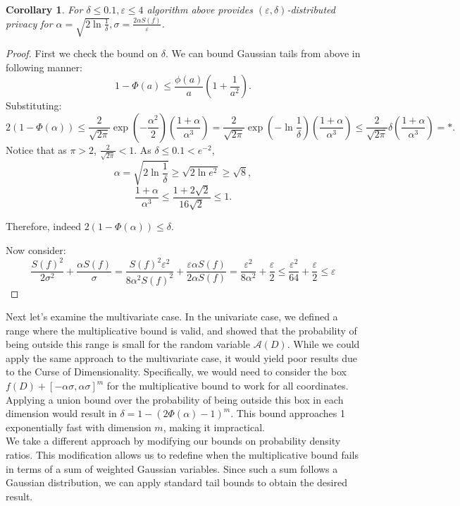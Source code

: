 \documentclass[12pt,letterpaper]{article}
\let\eps\varepsilon
\newtheorem{corollary}{Corollary}
\begin{document}
\begin{corollary}
  For $\delta \leq 0.1, \eps \leq 4$ algorithm above provides $(\eps, \delta)$-distributed privacy for $\alpha = \sqrt{2 \ln{\frac{1}{\delta}}}, \sigma = \frac{2\alpha S(f)}{\eps}$.
\end{corollary}
\begin{proof}
First we check the bound on $\delta$. We can bound Gaussian tails from above in following manner:
$$1 - \Phi(a) \leq \frac{\phi(a)}{a}\left(1 + \frac{1}{a^2}\right).$$
Substituting:
$$
2(1 - \Phi(\alpha)) \leq \frac{2}{\sqrt{2\pi}} \exp\left(-\frac{\alpha^2}{2}\right)\left(\frac{1 + \alpha}{\alpha^3}\right) = \frac{2}{\sqrt{2\pi}} \exp\left(-\ln\frac{1}{\delta}\right)\left(\frac{1 + \alpha}{\alpha^3}\right) \leq \frac{2}{\sqrt{2\pi}}\delta \left(\frac{1 + \alpha}{\alpha^3}\right) = *.
$$
Notice that as $\pi > 2$, $\frac{2}{\sqrt{2\pi}} < 1$. As $\delta \leq 0.1 < e^{-2}$, $$\alpha = \sqrt{2\ln\frac{1}{\delta}} \geq \sqrt{2\ln e^2} \geq \sqrt{8},$$ 
$$\frac{1 + \alpha}{\alpha^3} \leq \frac{1 + 2\sqrt{2}}{16\sqrt{2}} \leq 1.$$

Therefore, indeed $2(1 - \Phi(\alpha)) \leq \delta$.

Now consider:
$$\frac{S(f)^2}{2\sigma^2} + \frac{\alpha S(f)}{\sigma} = \frac{S(f)^2\eps^2}{8\alpha^2S(f)^2} + \frac{\eps \alpha S(f)}{2\alpha S(f)} = \frac{\eps^2}{8\alpha^2} + \frac{\eps}{2} \leq \frac{\eps^2}{64} + \frac{\eps}{2} \leq \eps$$
\end{proof}

Next let's examine the multivariate case. In the univariate case, we defined a range where the multiplicative bound is valid, and showed that the probability of being outside this range is small for the random variable $\mathcal{A}(D)$. While we could apply the same approach to the multivariate case, it would yield poor results due to the Curse of Dimensionality. Specifically, we would need to consider the box $f(D) + [-\alpha\sigma, \alpha\sigma]^m$ for the multiplicative bound to work for all coordinates. Applying a union bound over the probability of being outside this box in each dimension would result in $\delta = 1 - (2\Phi(\alpha) - 1)^m$. This bound approaches 1 exponentially fast with dimension $m$, making it impractical.\\

We take a different approach by modifying our bounds on probability density ratios. This modification allows us to redefine when the multiplicative bound fails in terms of a sum of weighted Gaussian variables. Since such a sum follows a Gaussian distribution, we can apply standard tail bounds to obtain the desired result.
\end{document}
